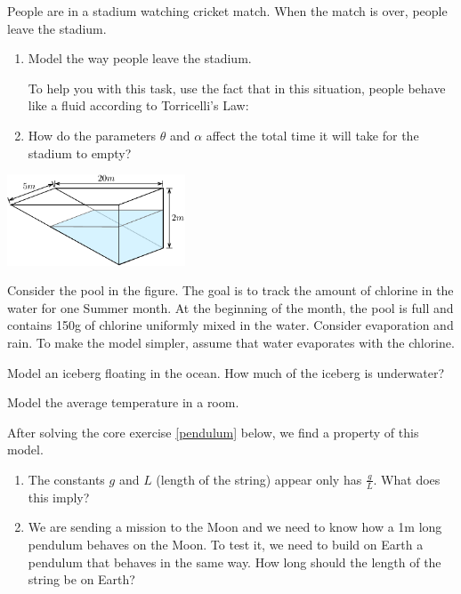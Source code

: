 \begin{exercises}
\begin{problist}
	\prob People are in a stadium watching cricket match. When the match is over, people leave the stadium. 
	
	\begin{enumerate}
	\item Model the way people leave the stadium.
	
	To help you with this task, use the fact that in this situation, people behave like a fluid according to Torricelli's Law:
	
		\begin{center}
		\end{center}

	\item How do the parameters $\theta$ and $\alpha$ affect the total time it will take for the stadium to empty?
	\end{enumerate}
	
	\begin{center}
		\includegraphics*[width=150pt]{images/module11-pool.pdf}
	\end{center}
	
	
	\prob Consider the pool in the figure. The goal is to track the amount of chlorine in the water for one Summer month. At the beginning of the month, the pool is full and contains 150g of chlorine uniformly mixed in the water. Consider evaporation and rain. To make the model simpler, assume that water evaporates with the chlorine.
	
	\prob Model an iceberg floating in the ocean. How much of the iceberg is underwater?
	
	\prob Model the average temperature in a room.
	
	\prob After solving the core exercise \ref{pendulum} below, we find a property of this model. 
	\begin{enumerate}
		\item The constants $g$ and $L$ (length of the string) appear only has $\frac{g}{L}$. What does this imply?
		\item We are sending a mission to the Moon and we need to know how a 1m long pendulum behaves on the Moon. To test it, we need to build on Earth a pendulum that behaves in the same way. How long should the length of the string be on Earth?
	\end{enumerate}
	


\end{problist}
\end{exercises}
